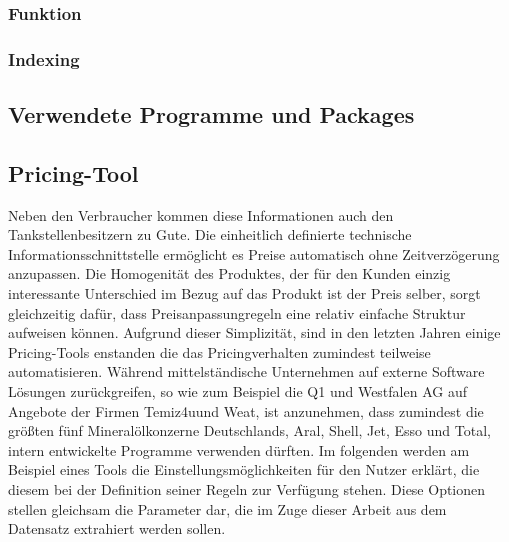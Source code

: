 \documentclass[12pt,a4paper,bibliography=totocnumbered,listof=totocnumbered]{scrartcl}
\begin{document}
\subsubsection{Funktion}

\subsubsection{Indexing}

\subsection{Verwendete Programme und Packages}

\subsection{Pricing-Tool}

Neben den Verbraucher kommen diese Informationen auch den Tankstellenbesitzern zu Gute. Die einheitlich definierte technische Informationsschnittstelle ermöglicht es Preise automatisch ohne Zeitverzögerung anzupassen. Die Homogenität des Produktes, der für den Kunden einzig interessante Unterschied im Bezug auf das Produkt ist der Preis selber, sorgt gleichzeitig dafür, dass Preisanpassungregeln eine relativ einfache Struktur aufweisen können. Aufgrund dieser Simplizität, sind in den letzten Jahren einige Pricing-Tools enstanden die das Pricingverhalten zumindest teilweise automatisieren. Während mittelständische Unternehmen auf externe Software Lösungen zurückgreifen, so wie zum Beispiel die Q1 und Westfalen AG auf Angebote der Firmen Temiz4u\footnotemark[1] und Weat\footnotemark[2], ist anzunehmen, dass zumindest die größten fünf Mineralölkonzerne Deutschlands, Aral, Shell, Jet, Esso und Total, intern entwickelte Programme verwenden dürften. Im folgenden werden am Beispiel eines Tools die Einstellungsmöglichkeiten für den  Nutzer erklärt, die diesem bei der Definition seiner Regeln zur Verfügung stehen. Diese Optionen stellen gleichsam die Parameter dar, die im Zuge dieser Arbeit aus dem Datensatz extrahiert werden sollen.
\end{document}
